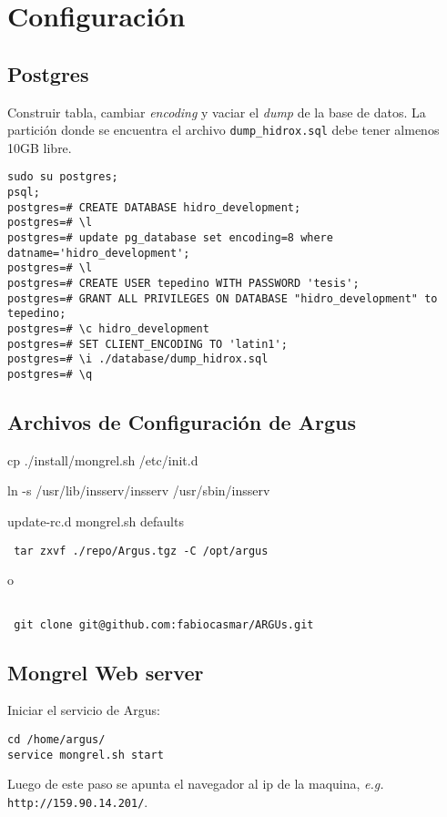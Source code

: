 \documentclass[spanish,10pt]{article}
\begin{document}
\section{Configuración}


\subsection{Postgres}
Construir tabla, cambiar \emph{encoding} y vaciar el \emph{dump} de la base de datos. La partición donde se encuentra el archivo 
\verb+dump_hidrox.sql+ debe tener almenos 10GB libre.
\begin{verbatim}
sudo su postgres; 
psql;
postgres=# CREATE DATABASE hidro_development;
postgres=# \l
postgres=# update pg_database set encoding=8 where datname='hidro_development';
postgres=# \l
postgres=# CREATE USER tepedino WITH PASSWORD 'tesis';
postgres=# GRANT ALL PRIVILEGES ON DATABASE "hidro_development" to tepedino;
postgres=# \c hidro_development
postgres=# SET CLIENT_ENCODING TO 'latin1';
postgres=# \i ./database/dump_hidrox.sql
postgres=# \q
\end{verbatim}
\subsection{Archivos de Configuración de Argus}
\item[] cp ./install/mongrel.sh /etc/init.d
\item[] ln -s /usr/lib/insserv/insserv /usr/sbin/insserv
\item[] update-rc.d mongrel.sh defaults
\begin{verbatim}
 tar zxvf ./repo/Argus.tgz -C /opt/argus
\end{verbatim}
o
\begin{verbatim}

 git clone git@github.com:fabiocasmar/ARGUs.git
\end{verbatim}
\subsection{Mongrel Web server}
Iniciar el servicio de Argus: 
\begin{verbatim}
cd /home/argus/
service mongrel.sh start
\end{verbatim}
Luego de este paso se apunta el navegador al ip de la maquina, \emph{e.g.} \texttt{http://159.90.14.201/}.
\end{document}
